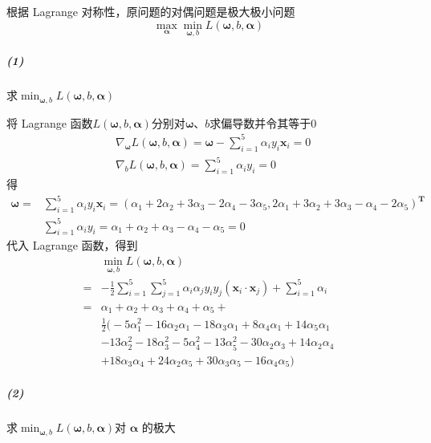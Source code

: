 \documentclass{article}
\begin{document}
根据 Lagrange 对称性，原问题的对偶问题是极大极小问题
\begin{equation*}
    \max_{\boldsymbol{\alpha}}{\min_{\boldsymbol{\omega},b}{L(\boldsymbol{\omega},b,\boldsymbol{\alpha})}}
\end{equation*}

\subparagraph{(1)} 求$\displaystyle \min_{\boldsymbol{\omega},b}{L(\boldsymbol{\omega},b,\boldsymbol{\alpha})}$

将 Lagrange 函数$L(\boldsymbol{\omega}, b, \boldsymbol{\alpha})$分别对$\boldsymbol{\omega}$、$b$求偏导数并令其等于0
\begin{align*}
     & \nabla_{\boldsymbol{\omega}}{L(\boldsymbol{\omega}, b, \boldsymbol{\alpha})}  = \boldsymbol{\omega} - \sum_{i = 1}^{5}{\alpha_i y_i \boldsymbol{x}_i} = 0 \\
     & \nabla_{b}{L(\boldsymbol{\omega}, b, \boldsymbol{\alpha})}                    = \sum_{i = 1}^{5}{\alpha_i y_i} = 0
\end{align*}
得
\begin{align*}
    \boldsymbol{\omega} = & \sum_{i = 1}^{5}{\alpha_i y_i \boldsymbol{x}_i} = (\alpha_1 + 2\alpha_2 + 3\alpha_3 - 2\alpha_4 - 3\alpha_5, 2\alpha_1 + 3\alpha_2 + 3\alpha_3 - \alpha_4 - 2\alpha_5)^\mathbf{T} \\
                          & \sum_{i = 1}^{5}{\alpha_i y_i} = \alpha_1 + \alpha_2 + \alpha_3 - \alpha_4 - \alpha_5 = 0
\end{align*}
代入 Lagrange 函数，得到
\begin{align*}
      & \min_{\boldsymbol{\omega},b}{L(\boldsymbol{\omega},b,\boldsymbol{\alpha})}                                                                      \\
    = & -\frac{1}{2}\sum_{i = 1}^{5}{\sum_{j = 1}^{5}{\alpha_i \alpha_j y_i y_j(\boldsymbol{x}_i \cdot \boldsymbol{x}_j)}} + \sum_{i = 1}^{5}{\alpha_i} \\
    = & \alpha _1+\alpha _2+\alpha _3+\alpha _4+\alpha _5+                                                                                              \\
      & \frac{1}{2} \big(-5 \alpha _1^2-16 \alpha _2 \alpha _1-18 \alpha _3 \alpha _1+8 \alpha _4 \alpha _1+14 \alpha _5 \alpha _1                      \\
      & -13 \alpha _2^2-18 \alpha _3^2-5 \alpha _4^2-13 \alpha _5^2-30 \alpha _2 \alpha _3+14 \alpha _2 \alpha _4                                       \\
      & +18 \alpha _3 \alpha _4+24 \alpha _2 \alpha _5+30 \alpha _3 \alpha _5-16 \alpha _4 \alpha _5\big)
\end{align*}
\subparagraph{(2)} 求$\displaystyle \min_{\boldsymbol{\omega},b}{L(\boldsymbol{\omega},b,\boldsymbol{\alpha})}$对 $\boldsymbol{{\alpha}}$ 的极大
\end{document}
